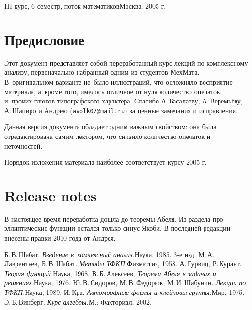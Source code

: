 \documentclass[a4paper]{article}
\begin{document}
{III курс, 6 семестр, поток математиков}{Москва, 2005 г.}

\pagebreak
\tableofcontents

\pagebreak

\section*{Предисловие}

Этот документ представляет собой переработанный курс лекций по комплексному анализу, первоначально набранный
одним из студентов МехМата. В~оригинальном варианте не~было иллюстраций, что осложняло восприятие материала,
а~кроме того, имелось отличное от нуля количество опечаток и~прочих глюков типографского характера. Спасибо
А.\,Басалаеву, А.\,Веремьёву, А.\,Шапиро и Андрею (\texttt{avolk07@mail.ru}) за ценные замечания и исправления.

Данная версия документа обладает одним важным свойством: она была отредактирована самим лектором, что снизило количество опечаток и неточностей.

Порядок изложения материала наиболее соответствует курсу 2005 г.

\section*{Release notes}

В настоящее время переработка дошла до теоремы Абеля.
Из раздела про эллиптические функции остался только синус Якоби.
В последней редакции внесены правки 2010 года от Андрея.

\medskip
\dmvntrail


\begin{thebibliography}{4}
\setlength\itemsep{-.5mm}
Б.\,В.\,Шабат. \emph{Введение в~комлексный анализ.}\т Наука, 1985. 3-е изд.
 М.\,А.\,Лаврентьев, Б.\,В.\,Шабат. \emph{Методы ТФКП.}\т Физматгиз, 1958.
 А.\,Гурвиц, Р.\,Курант. \emph{Теория функций.}\т Наука, 1968.
 В.\,Б.\,Алексеев, \emph{Теорема Абеля в задачах и решениях.}\т Наука, 1976.
 Ю.\,В.\,Сидоров, М.\,В.\,Федорюк, М.\,И.\,Шабунин. \emph{Лекции по ТФКП.}\т Наука, 1989.
 И.\,Кра. \emph{Автоморфные формы и клейновы группы.}\т Мир, 1975.
 Э.\,Б.\,Винберг. \emph{Курс алгебры.}\т М.: Факториал, 2002.
\end{thebibliography}
\end{document}
